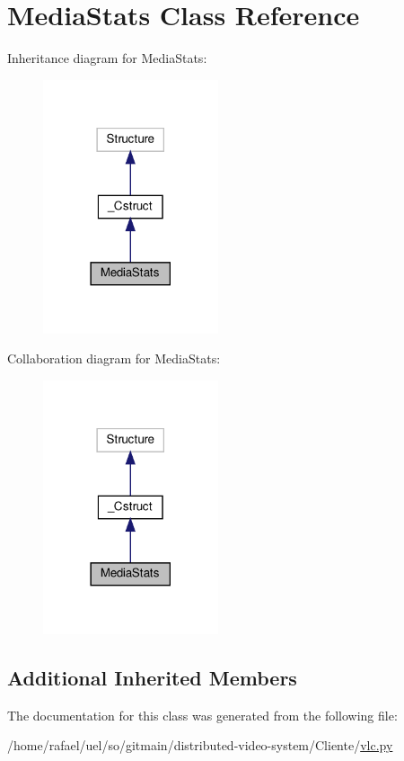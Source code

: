 \hypertarget{classvlc_1_1_media_stats}{}\section{Media\+Stats Class Reference}
\label{classvlc_1_1_media_stats}


Inheritance diagram for Media\+Stats\+:
\nopagebreak
\begin{figure}[H]
\begin{center}
\leavevmode
\includegraphics[width=146pt]{classvlc_1_1_media_stats__inherit__graph}
\end{center}
\end{figure}


Collaboration diagram for Media\+Stats\+:
\nopagebreak
\begin{figure}[H]
\begin{center}
\leavevmode
\includegraphics[width=146pt]{classvlc_1_1_media_stats__coll__graph}
\end{center}
\end{figure}
\subsection*{Additional Inherited Members}


The documentation for this class was generated from the following file\+:\begin{DoxyCompactItemize}
\item 
/home/rafael/uel/so/gitmain/distributed-\/video-\/system/\+Cliente/\hyperlink{vlc_8py}{vlc.\+py}\end{DoxyCompactItemize}
